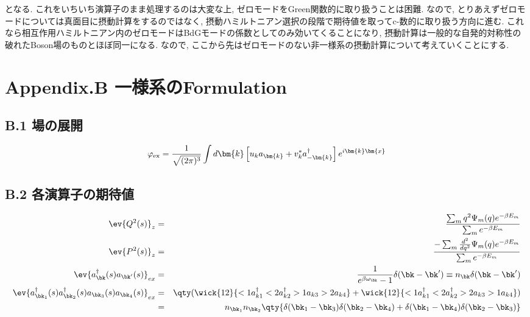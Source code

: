 \documentclass[10.5pt,a4paper]{jreport}
\def\theequation{\thechapter.\arabic{equation}}
\begin{document}
となる. これをいちいち演算子のまま処理するのは大変な上, ゼロモードをGreen関数的に取り扱うことは困難. なので, とりあえずゼロモードについては真面目に摂動計算をするのではなく, 摂動ハミルトニアン選択の段階で期待値を取ってc-数的に取り扱う方向に進む. これなら相互作用ハミルトニアン内のゼロモードはBdGモードの係数としてのみ効いてくることになり, 摂動計算は一般的な自発的対称性の破れたBoson場のものとほぼ同一になる. なので, ここから先はゼロモードのない非一様系の摂動計算について考えていくことにする.
\newpage
\section*{Appendix.B  一様系のFormulation}
\renewcommand{\theequation}{B.\arabic{equation}}
\subsection*{B.1  場の展開}
\begin{eqnarray}
  \varphi_{\rm ex} = \frac{1}{\sqrt{(2\pi)^3}}\int d\bm{k} \left[ u_ka_{\bm{k}} + v_k^*a^\dagger_{-\bm{k}} \right]e^{i\bm{k}\bm{x}}
\end{eqnarray}
\subsection*{B.2  各演算子の期待値}
\begin{eqnarray}
  \ev{Q^2(s)}_z &=& \frac{\sum_mq^2\Psi_m(q)e^{-\beta E_m}}{\sum_me^{-\beta E_m}}\\
  \ev{P^2(s)}_z &=& \frac{-\sum_m\frac{d^2}{dq^2}\Psi_m(q)e^{-\beta E_m}}{\sum_me^{-\beta E_m}}\\
  \ev{a_{\bk}^\dagger(s) a_{\bk'}(s)}_{ex} &=& \frac{1}{e^{\beta\omega_{\bk}}-1}\delta(\bk-\bk') \equiv n_{\bk}\delta(\bk - \bk')\\
  \nonumber  \ev{a_{\bk_1}^\dagger(s)a_{\bk_2}^\dagger(s) a_{\bk_3}(s)a_{\bk_4}(s)}_{ex} &=& \qty(\wick{12}{<1a^\dagger_{k1}<2a^\dagger_{k2}>1a_{k3}>2a_{k4}} + \wick{12}{<1a^\dagger_{k1}<2a^\dagger_{k2}>2a_{k3}>1a_{k4}})\\
  &=& n_{\bk_1}n_{\bk_2}\qty{\delta(\bk_1 - \bk_3)\delta(\bk_2 - \bk_4) + \delta(\bk_1 - \bk_4)\delta(\bk_2 - \bk_3)}
\end{eqnarray}
\end{document}
